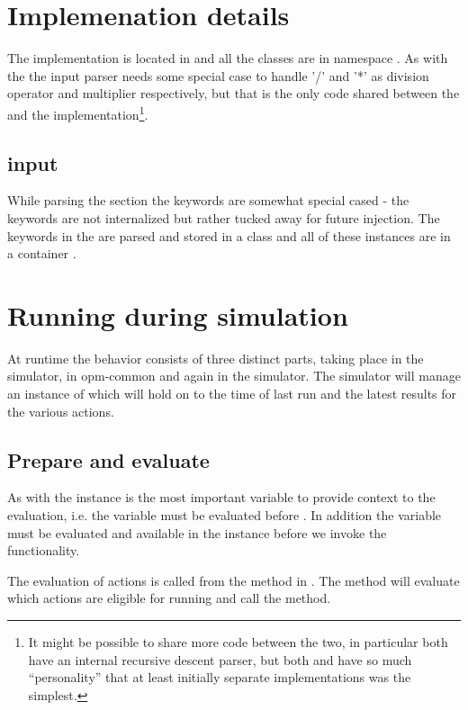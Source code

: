 \section{Implemenation details}
The \actionx{} implementation is located in
 and all the classes are in namespace
. As with the \udq{} the input parser needs some special
case to handle '/' and '*' as division operator and multiplier respectively, but
that is the only code shared between the \udq{} and the \actionx{}
implementation\footnote{It might be possible to share more code between the two,
in particular both have an internal recursive descent parser, but both \udq{}
and \actionx{} have so much ``personality'' that at least initially separate
implementations was the simplest.}.

\subsection{\actionx{} input}
While parsing the  section the \actionx{} keywords are somewhat
special cased - the keywords are not internalized but rather tucked away for
future injection. The keywords in the \actionx{} are parsed and stored in a
class  and all of these instances are in a container
.


\section{Running \actionx{} during simulation}
At runtime the \actionx{} behavior consists of three distinct parts, taking
place in the simulator, in opm-common and again in the simulator. The simulator
will manage an instance of  which will hold on to the
time of last run and the latest results for the various actions.

\subsection{Prepare and evaluate}
As with \udq{} the  instance is the most important
variable to provide context to the \actionx{} evaluation, i.e. the
 variable must be evaluated before \actionx{}. In
addition the \udq{} variable must be evaluated and available in the
 instance before we invoke the \actionx{}
functionality.

The evaluation of actions is called from the method 
in . The method will evaluate which actions are eligible for
running and call the  method.

